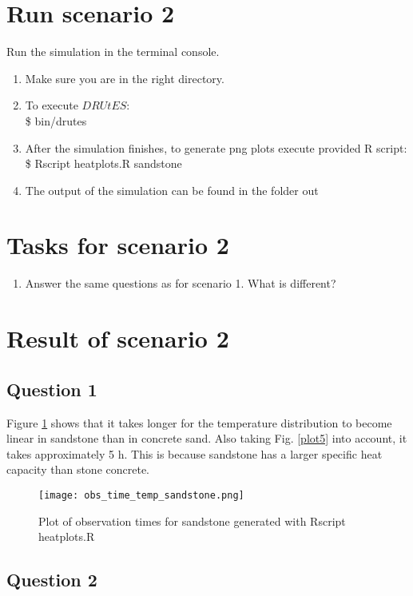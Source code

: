 \documentclass[
10pt, %
a4paper, %
oneside, %
headinclude,footinclude, %
BCOR5mm, %
]{scrartcl}
\begin{document}
\section*{Run scenario 2}
Run the simulation in the terminal console.
\begin{enumerate}
\item Make sure you are in the right directory. 
\item To execute $DRUtES$: \\
\$ bin/drutes
\item After the simulation finishes, to generate png plots execute provided R script: \\
\$ Rscript heatplots.R sandstone
\item The output of the simulation can be found in the folder out
\end{enumerate}

\section*{Tasks for scenario 2}

\begin{enumerate}
\item Answer the same questions as for scenario 1. What is different?
\end{enumerate}

\section*{Result of scenario 2}
\subsection*{Question 1}
Figure \ref{plot4} shows that it takes longer for the temperature distribution to become linear in sandstone than in concrete sand. Also taking Fig. \ref{plot5} into account, it takes approximately 5 h. This is because sandstone has a larger specific heat capacity than stone concrete.

\begin{figure}[!h]
\centering
\texttt{[image: obs\_time\_temp\_sandstone.png]}
\caption{\label{plot4}Plot of observation times for sandstone generated with Rscript heatplots.R}
\end{figure}

\subsection*{Question 2}
\end{document}

